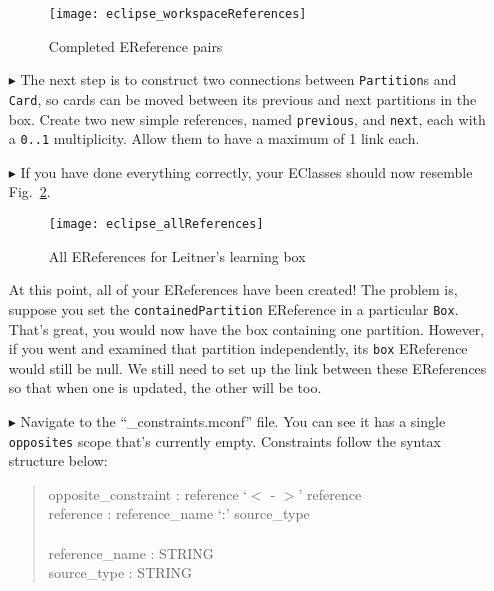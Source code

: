 \begin{itemize}
\vspace{0.5cm}

\begin{figure}[htbp]
	\centering
  \texttt{[image: eclipse\_workspaceReferences]}
	\caption{Completed EReference pairs}
	\label{fig:almostAllReferences}
\end{figure} 

\item[$\blacktriangleright$] The next step is to construct two connections between \texttt{Partition}s and \texttt{Card}, so cards can be moved between its
previous and next partitions in the box. Create two new simple references, named \texttt{previous}, and \texttt{next}, each with a \texttt{0..1} multiplicity.
Allow them to have a maximum of 1 link each.

\vspace{0.5cm}

\item[$\blacktriangleright$] If you have done everything correctly, your EClasses should now resemble Fig.~\ref{fig:allReferences}. 

\vspace{0.5cm}

\begin{figure}[htbp]
	\centering
  \texttt{[image: eclipse\_allReferences]}
	\caption{All EReferences for Leitner's learning box}
	\label{fig:allReferences}
\end{figure} 

\clearpage

At this point, all of your EReferences have been created! The problem is, suppose you set the \texttt{containedPartition} EReference in a particular
\texttt{Box}. That's great, you would now have the box containing one partition. However, if you went and examined that partition independently, its
\texttt{box} EReference would still be null. We still need to set up the link between these EReferences so that when one is updated, the other will be too.

\vspace{0.5cm}

\item[$\blacktriangleright$] Navigate to the ``\_constraints.mconf'' file. You can see it has a single \texttt{opposites} scope that's currently empty.
Constraints follow the syntax structure below: 
{ \begin{quote} \small
	opposite\_constraint : reference `$<$ - $>$' reference \\
	reference : reference\_name `:' source\_type \\
	\\
	reference\_name : STRING \\
	source\_type : STRING \\
\end{quote} }


\end{itemize}
